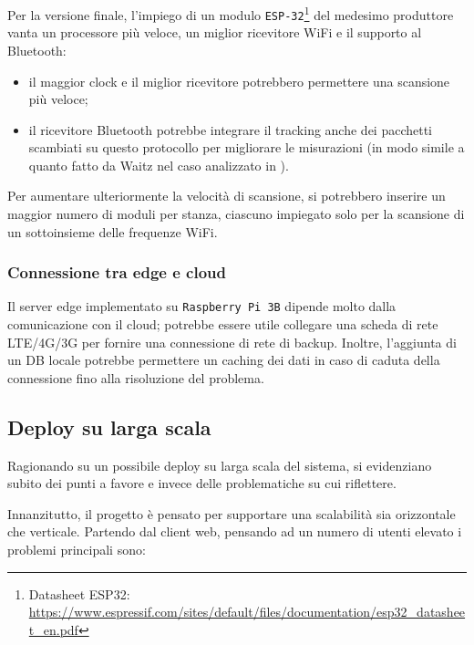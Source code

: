 Per la versione finale, l'impiego di un modulo \texttt{ESP-32}\footnote{Datasheet ESP32: \url{https://www.espressif.com/sites/default/files/documentation/esp32_datasheet_en.pdf}}
del medesimo produttore vanta un processore più veloce, un miglior ricevitore WiFi e il supporto al Bluetooth:
\begin{itemize}
  \item
    il maggior clock e il miglior ricevitore potrebbero permettere una scansione più veloce;
  \item
    il ricevitore Bluetooth potrebbe integrare il tracking anche dei pacchetti scambiati su questo protocollo per migliorare le misurazioni
    (in modo simile a quanto fatto da Waitz nel caso analizzato in ).
\end{itemize}

Per aumentare ulteriormente la velocità di scansione, si potrebbero inserire un maggior numero di moduli per stanza, ciascuno impiegato solo per la scansione di un sottoinsieme delle frequenze WiFi.

\subsubsection{Connessione tra edge e cloud}

Il server edge implementato su \texttt{Raspberry Pi 3B} dipende molto dalla comunicazione con il cloud;
potrebbe essere utile collegare una scheda di rete LTE/4G/3G
per fornire una connessione di rete di backup.
Inoltre, l'aggiunta di un DB locale potrebbe permettere un caching dei dati in caso di caduta della connessione fino alla risoluzione del problema.

\subsection{Deploy su larga scala}

Ragionando su un possibile deploy su larga scala del sistema, si evidenziano subito dei punti a favore e invece delle problematiche su cui riflettere.

Innanzitutto, il progetto è pensato per supportare una scalabilità sia orizzontale che verticale.
Partendo dal client web, pensando ad un numero di utenti elevato i problemi principali sono:

